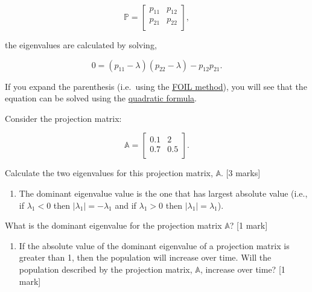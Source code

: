 \documentclass[]{book}
\providecommand{\tightlist}{%
  \setlength{\itemsep}{0pt}\setlength{\parskip}{0pt}}
\begin{document}
\begin{equation}
\mathbb{P} = 
\left[
\begin{array}{cc}
p_{11} & p_{12} \\
p_{21} & p_{22} \\
\end{array}
\right],
\end{equation}

the eigenvalues are calculated by solving,

\begin{equation}
0 = (p_{11} - \lambda)(p_{22}-\lambda) - p_{12}p_{21}.
\end{equation}

If you expand the parenthesis (i.e.~using the
\href{https://en.wikipedia.org/wiki/FOIL_method}{FOIL method}), you will
see that the equation can be solved using the
\href{https://en.wikipedia.org/wiki/Quadratic_formula}{quadratic
formula}.

Consider the projection matrix:

\begin{equation}
\mathbb{A} = 
\left[
\begin{array}{cc}
0.1 & 2 \\
0.7 & 0.5 \\
\end{array}
\right].
\end{equation}

Calculate the two eigenvalues for this projection matrix,
\(\mathbb{A}\). {[}3 marks{]}

\begin{enumerate}
\def\labelenumi{\arabic{enumi}.}
\setcounter{enumi}{4}
\tightlist
\item
  The dominant eigenvalue value is the one that has largest absolute
  value (i.e., if \(\lambda_1 < 0\) then \(|\lambda_1| = -\lambda_1\)
  and if \(\lambda_1 >0\) then \(|\lambda_1| = \lambda_1\)).
\end{enumerate}

What is the dominant eigenvalue for the projection matrix
\(\mathbb{A}\)? {[}1 mark{]}

\begin{enumerate}
\def\labelenumi{\arabic{enumi}.}
\setcounter{enumi}{5}
\tightlist
\item
  If the absolute value of the dominant eigenvalue of a projection
  matrix is greater than 1, then the population will increase over time.
  Will the population described by the projection matrix,
  \(\mathbb{A}\), increase over time? {[}1 mark{]}
\end{enumerate}
\end{document}
